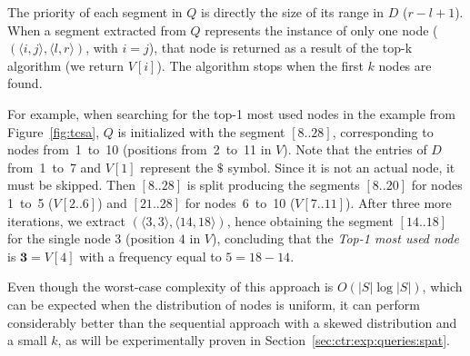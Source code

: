 \begin{itemize}
\begin{itemize}
	The priority of each segment in $Q$ is
	directly the size of its range in $D$ ($r-l+1$). 
	When a segment extracted from $Q$ represents the instance of only one node ($(\langle i,j\rangle, \langle l,r\rangle)$, with $i=j$),
	that node is returned as a result of the top-k algorithm (we return $V[i]$). The algorithm stops when the first $k$ nodes are found.

	For example, when searching for the top-1 most used nodes in the example from Figure~\ref{fig:tcsa}, $Q$ is initialized with
	the segment $[8..28]$, corresponding to nodes from~1~to~10 (positions from~2~to~11 in $V$). Note
	that the entries of $D$ from~1~to~7 and $V[1]$ represent the $\$$ symbol. Since it is not an actual node, it
	 must be skipped. Then $[8..28]$ is split producing the segments $[8..20]$ for nodes 1~to~5 ($V[2..6]$)
	and $[21..28]$ for nodes~6~to~10 ($V[7..11]$). After three more iterations, we extract
	$(\langle 3,3\rangle, \langle 14,18\rangle)$, hence obtaining the segment $[14..18]$ for
	the single node 3 (position $4$ in $V$), concluding that the  {\em Top-1 most used node} is 
	$\mathbf{3}=V[4]$ with a frequency equal to $5=18-14$.
	
	Even though the worst-case complexity of this approach is $O(|S|\log|S|)$, which can be expected when the distribution of nodes is uniform, it can perform considerably better than the sequential approach with a skewed distribution and a small $k$, as will be experimentally proven in Section~\ref{sec:ctr:exp:queries:spat}.




\end{itemize}
\end{itemize}
